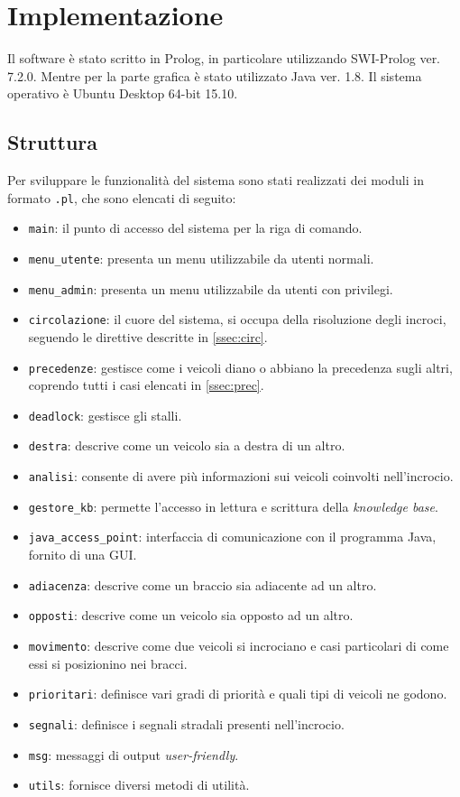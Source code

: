 \chapter{Implementazione}

Il software è stato scritto in Prolog, in particolare utilizzando SWI-Prolog ver. 7.2.0. Mentre per la parte grafica è stato utilizzato Java ver. 1.8. Il sistema operativo è Ubuntu Desktop 64-bit 15.10.

\section{Struttura}
Per sviluppare le funzionalità del sistema sono stati realizzati dei moduli in formato \texttt{.pl}, che sono elencati di seguito:
\begin{itemize}
\item \texttt{main}: il punto di accesso del sistema per la riga di comando.
\item \texttt{menu\_utente}: presenta un menu utilizzabile da utenti normali.
\item \texttt{menu\_admin}: presenta un menu utilizzabile da utenti con privilegi.
\item \texttt{circolazione}: il cuore del sistema, si occupa della risoluzione degli incroci, seguendo le direttive descritte in \ref{ssec:circ}.
\item \texttt{precedenze}: gestisce come i veicoli diano o abbiano la precedenza sugli altri, coprendo tutti i casi elencati in \ref{ssec:prec}.
\item \texttt{deadlock}: gestisce gli stalli.
\item \texttt{destra}: descrive come un veicolo sia a destra di un altro.
\item \texttt{analisi}: consente di avere più informazioni sui veicoli coinvolti nell'incrocio.
\item \texttt{gestore\_kb}: permette l'accesso in lettura e scrittura della \emph{knowledge base}.
\item \texttt{java\_access\_point}: interfaccia di comunicazione con il programma Java, fornito di una GUI.
\item \texttt{adiacenza}: descrive come un braccio sia adiacente ad un altro.
\item \texttt{opposti}: descrive come un veicolo sia opposto ad un altro.
\item \texttt{movimento}: descrive come due veicoli si incrociano e casi particolari di come essi si posizionino nei bracci.
\item \texttt{prioritari}: definisce vari gradi di priorità e quali tipi di veicoli ne godono.
\item \texttt{segnali}: definisce i segnali stradali presenti nell'incrocio.
\item \texttt{msg}: messaggi di output \emph{user-friendly}.
\item \texttt{utils}: fornisce diversi metodi di utilità.
\end{itemize}

